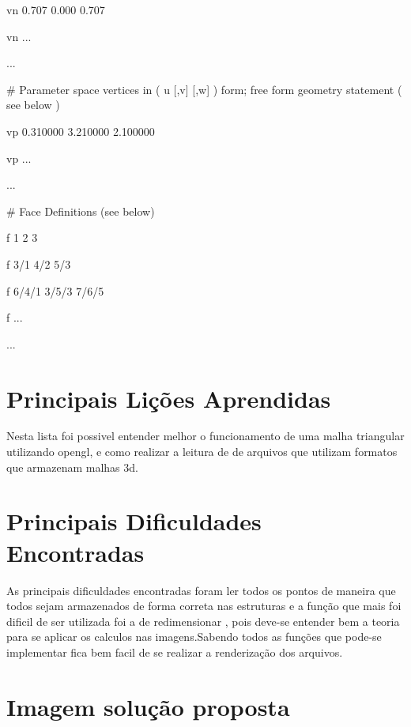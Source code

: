 \documentclass[12pt]{article}
\begin{document}
 
     vn 0.707 0.000 0.707
 
     vn ...
  
     ...

     \# Parameter space vertices in ( u [,v] [,w] ) form; free form geometry statement ( see below )

     vp 0.310000 3.210000 2.100000

     vp ...

     ...
 
    \# Face Definitions (see below)
  
     f 1 2 3
  
     f 3/1 4/2 5/3
 
     f 6/4/1 3/5/3 7/6/5
  
     f ...
  
     ...


   
\section{Principais Li\c{c}\~oes Aprendidas}
     Nesta lista foi possivel entender melhor o funcionamento de uma malha triangular utilizando opengl, e como realizar a leitura de
      de arquivos que utilizam formatos que armazenam malhas 3d.
\section{Principais Dificuldades Encontradas}
    As principais dificuldades encontradas foram ler todos os pontos de maneira que todos sejam armazenados de forma correta nas estruturas
    e a fun\c{c}\~ao que mais foi dificil de ser utilizada foi a de redimensionar , pois deve-se entender bem a teoria para se aplicar os calculos
    nas imagens.Sabendo todos as fun\c{c}ões que pode-se implementar fica bem facil de se realizar a renderiza\c{c}\~ao dos arquivos.

\section{Imagem solu\c{c}\~ao proposta}
\end{document}
